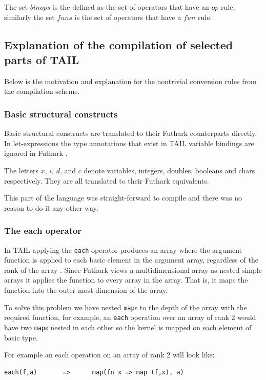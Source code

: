 \documentclass[11pt]{article}
\begin{document}
The set $binops$ is the defined as the set of operators that have an $op$ rule, similarly the set $funs$ is the set of
operators that have a $fun$ rule.

\subsection{Explanation of the compilation of selected parts of TAIL}
Below is the motivation and explanation for the nontrivial conversion rules from the compilation scheme. 

\subsubsection{Basic structural constructs} 
Basic structural constructs are translated to their Futhark counterparts directly.
In let-expressions the type annotations that exist in TAIL variable bindings are ignored in Futhark \cite{ElsmanDybdal:Array:2014} \cite{TroelsHenriksen}. 

The letters $x$, $i$, $d$, and $c$ denote variables, integers, doubles, booleans and chars respectively.
They are all translated to their Futhark equivalents.

This part of the language was straight-forward to compile and there was no reason to do it any other way.

\subsubsection{The each operator} 

In TAIL applying the {\tt each} operator produces an array where the argument function is applied to each basic element in the
argument array, regardless of the rank of the array \cite{ElsmanDybdal:Array:2014}.
Since Futhark views a multidimensional array as nested simple arrays it applies the function to every array in the array.
That is, it maps the function into the outer-most dimension of the array\cite{TroelsHenriksen}.
 
To solve this problem we have nested {\tt map}s to the depth of the array with the required function,
for example, an {\tt each} operation over an array of rank 2 would have two {\tt map}s nested in each other so the kernel is
mapped on each element of basic type.
 
For example an each operation on an array of rank 2 will look like:
\begin{lstlisting}[numbers=none,frame=none]
each(f,a)       =>      map(fn x => map (f,x), a)
\end{lstlisting}
\end{document}

